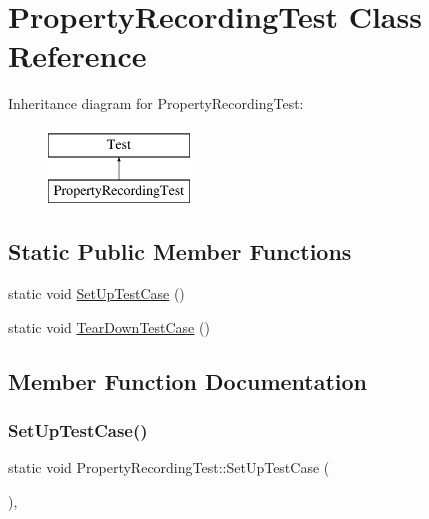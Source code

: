 \hypertarget{classPropertyRecordingTest}{}\section{Property\+Recording\+Test Class Reference}
\label{classPropertyRecordingTest}
Inheritance diagram for Property\+Recording\+Test\+:\begin{figure}[H]
\begin{center}
\leavevmode
\includegraphics[height=2.000000cm]{classPropertyRecordingTest}
\end{center}
\end{figure}
\subsection*{Static Public Member Functions}
\begin{DoxyCompactItemize}
\item 
static void \mbox{\hyperlink{classPropertyRecordingTest_a673c9dfcd9f0c8d10d0df765852c1669}{Set\+Up\+Test\+Case}} ()
\item 
static void \mbox{\hyperlink{classPropertyRecordingTest_ac0d2d47efbdc4399777dffca6071d15d}{Tear\+Down\+Test\+Case}} ()
\end{DoxyCompactItemize}


\subsection{Member Function Documentation}
\mbox{\label{classPropertyRecordingTest_a673c9dfcd9f0c8d10d0df765852c1669}} 
\subsubsection{\texorpdfstring{SetUpTestCase()}{SetUpTestCase()}}
{\footnotesize\ttfamily static void Property\+Recording\+Test\+::\+Set\+Up\+Test\+Case (\begin{DoxyParamCaption}{ }\end{DoxyParamCaption})\hspace{0.3cm}{\ttfamily [inline]}, {\ttfamily [static]}}

